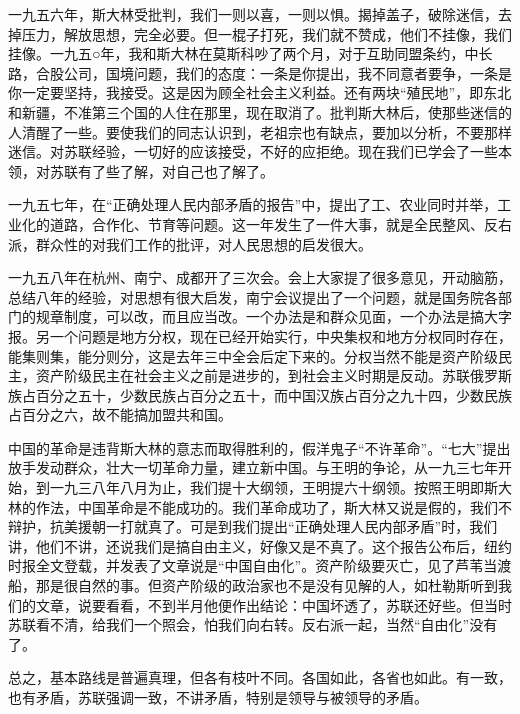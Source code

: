 一九五六年，斯大林受批判，我们一则以喜，一则以惧。揭掉盖子，破除迷信，去掉压力，解放思想，完全必要。但一棍子打死，我们就不赞成，他们不挂像，我们挂像。一九五○年，我和斯大林在莫斯科吵了两个月，对于互助同盟条约，中长路，合股公司，国境问题，我们的态度：一条是你提出，我不同意者要争，一条是你一定要坚持，我接受。这是因为顾全社会主义利益。还有两块“殖民地”，即东北和新疆，不准第三个国的人住在那里，现在取消了。批判斯大林后，使那些迷信的人清醒了一些。要使我们的同志认识到，老祖宗也有缺点，要加以分析，不要那样迷信。对苏联经验，一切好的应该接受，不好的应拒绝。现在我们已学会了一些本领，对苏联有了些了解，对自己也了解了。

一九五七年，在“正确处理人民内部矛盾的报告”中，提出了工、农业同时并举，工业化的道路，合作化、节育等问题。这一年发生了一件大事，就是全民整风、反右派，群众性的对我们工作的批评，对人民思想的启发很大。

一九五八年在杭州、南宁、成都开了三次会。会上大家提了很多意见，开动脑筋，总结八年的经验，对思想有很大启发，南宁会议提出了一个问题，就是国务院各部门的规章制度，可以改，而且应当改。一个办法是和群众见面，一个办法是搞大字报。另一个问题是地方分权，现在已经开始实行，中央集权和地方分权同时存在，能集则集，能分则分，这是去年三中全会后定下来的。分权当然不能是资产阶级民主，资产阶级民主在社会主义之前是进步的，到社会主义时期是反动。苏联俄罗斯族占百分之五十，少数民族占百分之五十，而中国汉族占百分之九十四，少数民族占百分之六，故不能搞加盟共和国。

中国的革命是违背斯大林的意志而取得胜利的，假洋鬼子“不许革命”。“七大”提出放手发动群众，壮大一切革命力量，建立新中国。与王明的争论，从一九三七年开始，到一九三八年八月为止，我们提十大纲领，王明提六十纲领。按照王明即斯大林的作法，中国革命是不能成功的。我们革命成功了，斯大林又说是假的，我们不辩护，抗美援朝一打就真了。可是到我们提出“正确处理人民内部矛盾”时，我们讲，他们不讲，还说我们是搞自由主义，好像又是不真了。这个报告公布后，纽约时报全文登载，并发表了文章说是“中国自由化”。资产阶级要灭亡，见了芦苇当渡船，那是很自然的事。但资产阶级的政治家也不是没有见解的人，如杜勒斯听到我们的文章，说要看看，不到半月他便作出结论：中国坏透了，苏联还好些。但当时苏联看不清，给我们一个照会，怕我们向右转。反右派一起，当然“自由化”没有了。

总之，基本路线是普遍真理，但各有枝叶不同。各国如此，各省也如此。有一致，也有矛盾，苏联强调一致，不讲矛盾，特别是领导与被领导的矛盾。


